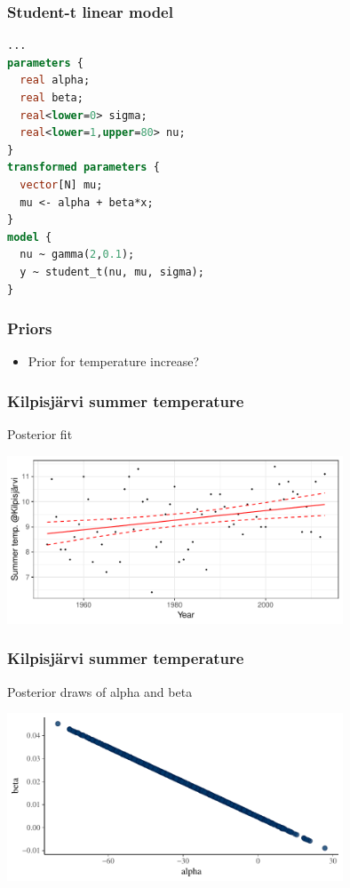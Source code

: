 \documentclass[10pt,handout]{beamer}
\begin{document}
\begin{frame}[fragile]

\frametitle{Student-t linear model}
  {\small
  \begin{lstlisting}[language=Stan]
...
parameters {
  real alpha;
  real beta;
  real<lower=0> sigma;
  real<lower=1,upper=80> nu;
}
transformed parameters {
  vector[N] mu;
  mu <- alpha + beta*x;
}
model {
  nu ~ gamma(2,0.1);
  y ~ student_t(nu, mu, sigma);
}
  \end{lstlisting}
}
\end{frame}

\begin{frame}

\frametitle{Priors}

  \begin{itemize}
  \item Prior for temperature increase?
  \end{itemize}

\end{frame}

\begin{frame}

\frametitle{Kilpisjärvi summer temperature}

  Posterior fit

  \begin{center}
    \includegraphics[width=10cm]{figs/kilpis_lin_pfit.pdf}
  \end{center}

\end{frame}

\begin{frame}[fragile]

\frametitle{Kilpisjärvi summer temperature}

  Posterior draws of alpha and beta

  \begin{center}
    \includegraphics[width=10cm]{figs/kilpis_lin_mcmc_scatter.pdf}
  \end{center}

\end{frame}
\end{document}
